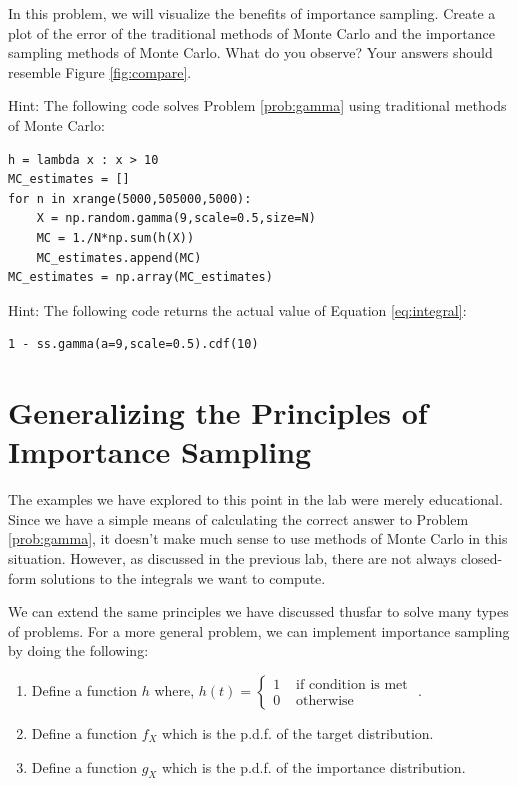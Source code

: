\begin{problem}
In this problem, we will visualize the benefits of importance sampling. Create a plot of the error of the traditional methods of Monte Carlo and the importance sampling methods of Monte Carlo. What do you observe? Your answers should resemble Figure \ref{fig:compare}.

Hint: The following code solves Problem \ref{prob:gamma} using traditional methods of Monte Carlo:
\begin{lstlisting}
h = lambda x : x > 10
MC_estimates = []
for n in xrange(5000,505000,5000):
    X = np.random.gamma(9,scale=0.5,size=N)
    MC = 1./N*np.sum(h(X))    
    MC_estimates.append(MC)
MC_estimates = np.array(MC_estimates)
\end{lstlisting}

Hint: The following code returns the actual value of Equation \ref{eq:integral}:
\begin{lstlisting}
1 - ss.gamma(a=9,scale=0.5).cdf(10)
\end{lstlisting}
\end{problem}

\section*{Generalizing the Principles of Importance Sampling}
The examples we have explored to this point in the lab were merely educational. Since we have a simple means of calculating the correct answer to Problem \ref{prob:gamma}, it doesn't make much sense to use methods of Monte Carlo in this situation. However, as discussed in the previous lab, there are not always closed-form solutions to the integrals we want to compute.

We can extend the same principles we have discussed thusfar to solve many types of problems. For a more general problem, we can implement importance sampling by doing the following:
\begin{enumerate}
\item Define a function $h$ where, $h(t) = \begin{cases}
1 & \text{ if condition is met }  \\ 
0 & \text{ otherwise}
\end{cases} $.  
\item Define a function $f_X$ which is the p.d.f. of the target distribution. 
\item Define a function $g_X$ which is the p.d.f. of the importance distribution.
\end{enumerate}

